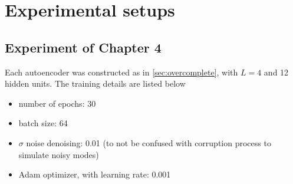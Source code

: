 \chapter{Experimental setups}\label{exp-setup} 

\section{Experiment of Chapter 4}\label{sec:setup-expII}
Each autoencoder was constructed as in \ref{sec:overcomplete}, with $L=4$ and 12 hidden units. The training details are listed below
\begin{itemize}
\item number of epochs: 30
\item batch size: 64
\item $\sigma$ noise denoising: 0.01 (to not be confused with corruption process to simulate noisy modes)
\item Adam optimizer, with learning rate: 0.001
\end{itemize}
